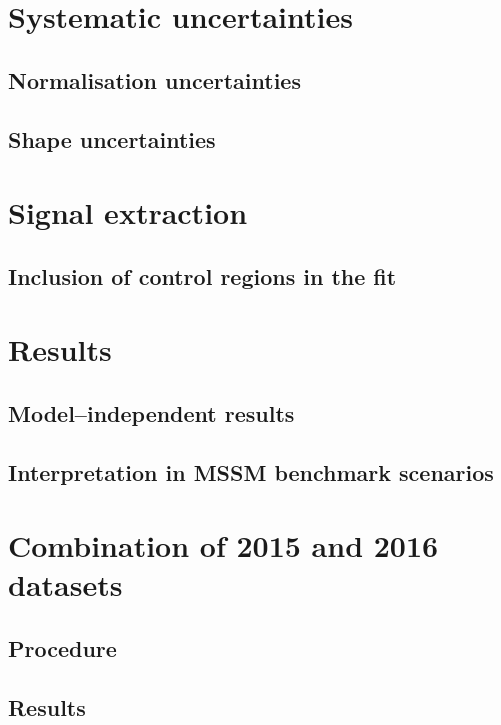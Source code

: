 \section{Systematic uncertainties}
\label{sec:mssm_uncs}

\subsection{Normalisation uncertainties}
\label{sec:mssm_uncs_norm}

\subsection{Shape uncertainties}
\label{sec:mssm_uncs_shape}

\section{Signal extraction}
\label{sec:mssm_signalextraction}

\subsection{Inclusion of control regions in the fit}
\label{sec:mssm_sigext_ctrl}

\section{Results}
\label{sec:mssm_results}

\subsection{Model--independent results}
\label{sec:mssm_results_modelindep}

\subsection{Interpretation in MSSM benchmark scenarios}
\label{sec:mssm_results_modeldep}

\section{Combination of 2015 and 2016 datasets}
\label{sec:mssm_combination}

\subsection{Procedure}
\label{sec:mssm_combination_procedure}

\subsection{Results}
\label{sec:mssm_combination_results}


